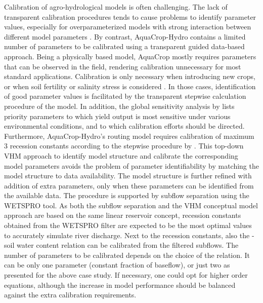 Calibration of agro-hydrological models is often challenging. The lack of transparent calibration procedures tends to cause problems to identify parameter values, especially for overparameterized models with strong interaction between different model parameters \parencite{andreassian2012, beven2006}. By contrast, AquaCrop-Hydro contains a limited number of parameters to be calibrated using a transparent guided data-based approach. Being a physically based model, AquaCrop mostly requires parameters that can be observed in the field, rendering calibration unnecessary for most standard applications. Calibration is only necessary when introducing new crops, or when soil fertility or salinity stress is considered \parencite{vanuytrecht2014a}. In those cases, identification of good parameter values is facilitated by the transparent stepwise calculation procedure of the model. In addition, the global sensitivity analysis by \textcite{vanuytrecht2014b} lists priority parameters to which yield output is most sensitive under various environmental conditions, and to which calibration efforts should be directed. Furthermore, AquaCrop-Hydro’s routing model requires calibration of maximum 3 recession constants according to the stepwise procedure by \textcite{willems2014a}. This top-down VHM approach to identify model structure and calibrate the corresponding model parameters avoids the problem of parameter identifiability by matching the model structure to data availability. The model structure is further refined with addition of extra parameters, only when these parameters can be identified from the available data. The procedure is supported by subflow separation using the WETSPRO tool. As both the subflow separation and the VHM conceptual model approach are based on the same linear reservoir concept, recession constants obtained from the WETSPRO filter are expected to be the most optimal values to accurately simulate river discharge. Next to the recession constants, also the \pbf-soil water content relation can  be calibrated from the filtered subflows. The number of parameters to be calibrated depends on the choice of the relation. It can be only one parameter (constant fraction of baseflow), or just two as presented for the above case study. If necessary, one could opt for higher order equations, although the increase in model performance should be balanced against the extra calibration requirements.

